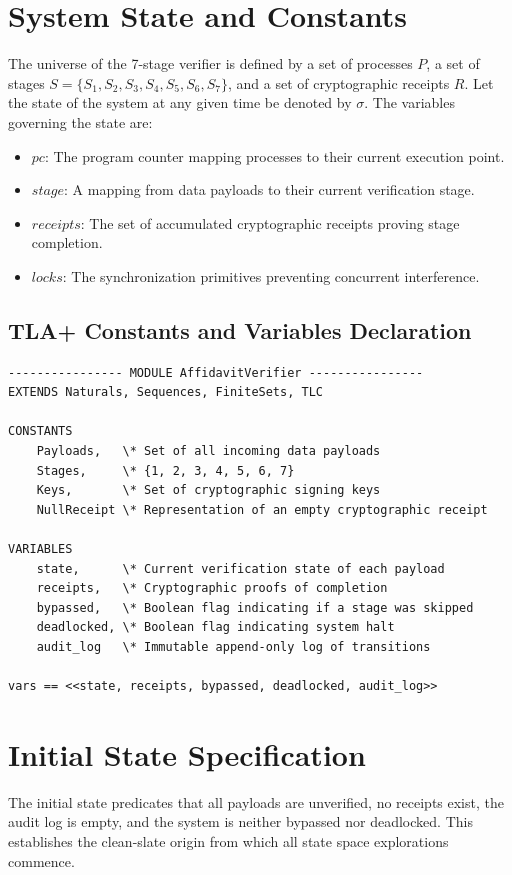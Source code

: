 \section{System State and Constants}
The universe of the 7-stage verifier is defined by a set of processes $P$, a set of stages $S = \{S_1, S_2, S_3, S_4, S_5, S_6, S_7\}$, and a set of cryptographic receipts $R$. Let the state of the system at any given time be denoted by $\sigma$. The variables governing the state are:
\begin{itemize}
    \item $pc$: The program counter mapping processes to their current execution point.
    \item $stage$: A mapping from data payloads to their current verification stage.
    \item $receipts$: The set of accumulated cryptographic receipts proving stage completion.
    \item $locks$: The synchronization primitives preventing concurrent interference.
\end{itemize}

\subsection{TLA+ Constants and Variables Declaration}
\begin{verbatim}
---------------- MODULE AffidavitVerifier ----------------
EXTENDS Naturals, Sequences, FiniteSets, TLC

CONSTANTS 
    Payloads,   \* Set of all incoming data payloads
    Stages,     \* {1, 2, 3, 4, 5, 6, 7}
    Keys,       \* Set of cryptographic signing keys
    NullReceipt \* Representation of an empty cryptographic receipt

VARIABLES 
    state,      \* Current verification state of each payload
    receipts,   \* Cryptographic proofs of completion
    bypassed,   \* Boolean flag indicating if a stage was skipped
    deadlocked, \* Boolean flag indicating system halt
    audit_log   \* Immutable append-only log of transitions

vars == <<state, receipts, bypassed, deadlocked, audit_log>>
\end{verbatim}

\section{Initial State Specification}
The initial state predicates that all payloads are unverified, no receipts exist, the audit log is empty, and the system is neither bypassed nor deadlocked. This establishes the clean-slate origin from which all state space explorations commence.

